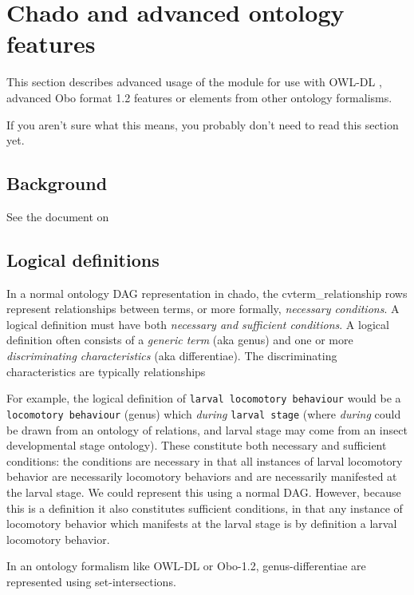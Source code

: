 \section{Chado and advanced ontology features}

This section describes advanced usage of the \cv module for use with
OWL-DL \cite{OWL}, advanced Obo format 1.2 \cite{OboFormat} features
or elements from other ontology formalisms.

If you aren't sure what this means, you probably don't need to read
this section yet.

\subsection{Background}

See the document on \cite{ConvertingOboToOWL}

\subsection{Logical definitions}

In a normal ontology DAG representation in chado, the
cvterm_relationship rows represent relationships between terms, or
more formally, {\em necessary conditions}. A logical definition must
have both {\em necessary and sufficient conditions}. A logical
definition often consists of a {\em generic term} (aka genus) and one
or more {\em discriminating characteristics} (aka differentiae). The
discriminating characteristics are typically relationships 

For example, the logical definition of {\tt larval locomotory
behaviour} would be a {\tt locomotory behaviour} (genus) which {\em
during} {\tt larval stage} (where {\em during} could be drawn from an
ontology of relations, and larval stage may come from an insect
developmental stage ontology). These constitute both necessary and
sufficient conditions: the conditions are necessary in that all
instances of larval locomotory behavior are necessarily locomotory
behaviors and are necessarily manifested at the larval stage. We could
represent this using a normal DAG. However, because this is a
definition it also constitutes sufficient conditions, in that any
instance of locomotory behavior which manifests at the larval stage is
by definition a larval locomotory behavior.

In an ontology formalism like OWL-DL or Obo-1.2, genus-differentiae
are represented using set-intersections.

